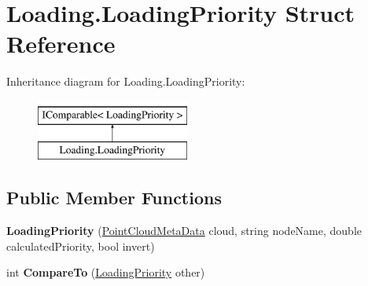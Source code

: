 \hypertarget{struct_loading_1_1_loading_priority}{}\section{Loading.\+Loading\+Priority Struct Reference}
\label{struct_loading_1_1_loading_priority}
Inheritance diagram for Loading.\+Loading\+Priority\+:\begin{figure}[H]
\begin{center}
\leavevmode
\includegraphics[height=2.000000cm]{struct_loading_1_1_loading_priority}
\end{center}
\end{figure}
\subsection*{Public Member Functions}
\begin{DoxyCompactItemize}
\item 
\mbox{\label{struct_loading_1_1_loading_priority_a598efdfb29010f81259575c1b5b6a4bc}} 
{\bfseries Loading\+Priority} (\hyperlink{class_cloud_data_1_1_point_cloud_meta_data}{Point\+Cloud\+Meta\+Data} cloud, string node\+Name, double calculated\+Priority, bool invert)
\item 
\mbox{\label{struct_loading_1_1_loading_priority_a953a6e0248f7224fe88ec1eca46c832d}} 
int {\bfseries Compare\+To} (\hyperlink{struct_loading_1_1_loading_priority}{Loading\+Priority} other)
\end{DoxyCompactItemize}
